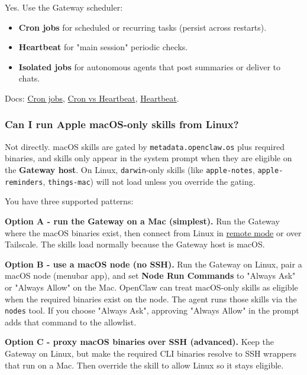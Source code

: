 Yes. Use the Gateway scheduler:

\begin{itemize}
  \item \textbf{Cron jobs} for scheduled or recurring tasks (persist across restarts).
  \item \textbf{Heartbeat} for "main session" periodic checks.
  \item \textbf{Isolated jobs} for autonomous agents that post summaries or deliver to chats.
\end{itemize}


Docs: \href{/automation/cron-jobs}{Cron jobs}, \href{/automation/cron-vs-heartbeat}{Cron vs Heartbeat},
\href{/gateway/heartbeat}{Heartbeat}.

\subsubsection{Can I run Apple macOS-only skills from Linux?}


Not directly. macOS skills are gated by \texttt{metadata.openclaw.os} plus required binaries, and skills only appear in the system prompt when they are eligible on the \textbf{Gateway host}. On Linux, \texttt{darwin}-only skills (like \texttt{apple-notes}, \texttt{apple-reminders}, \texttt{things-mac}) will not load unless you override the gating.

You have three supported patterns:

\textbf{Option A - run the Gateway on a Mac (simplest).}
Run the Gateway where the macOS binaries exist, then connect from Linux in \href{\#how-do-i-run-openclaw-in-remote-mode-client-connects-to-a-gateway-elsewhere}{remote mode} or over Tailscale. The skills load normally because the Gateway host is macOS.

\textbf{Option B - use a macOS node (no SSH).}
Run the Gateway on Linux, pair a macOS node (menubar app), and set \textbf{Node Run Commands} to "Always Ask" or "Always Allow" on the Mac. OpenClaw can treat macOS-only skills as eligible when the required binaries exist on the node. The agent runs those skills via the \texttt{nodes} tool. If you choose "Always Ask", approving "Always Allow" in the prompt adds that command to the allowlist.

\textbf{Option C - proxy macOS binaries over SSH (advanced).}
Keep the Gateway on Linux, but make the required CLI binaries resolve to SSH wrappers that run on a Mac. Then override the skill to allow Linux so it stays eligible.

